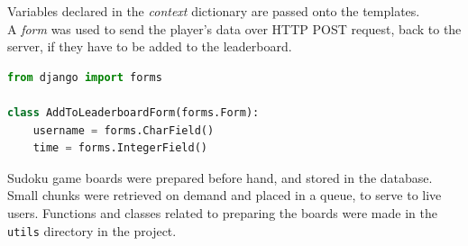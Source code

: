 \documentclass[12pt, a4paper]{report}
\begin{document}
    Variables declared in the \textit{context} dictionary are passed onto the templates.\\
    \newline
    A \emph{form} was used to send the player's data over HTTP POST request, back to the server, if they have to be added to the leaderboard.
    \begin{lstlisting}[language=Python, caption=mainapp/forms.py]
from django import forms

class AddToLeaderboardForm(forms.Form):
    username = forms.CharField()
    time = forms.IntegerField()
    \end{lstlisting}
    Sudoku game boards were prepared before hand, and stored in the database. Small chunks were retrieved on demand and placed in a queue, to serve to live users.
    Functions and classes related to preparing the boards were made in the \texttt{utils} directory in the project.\\
\end{document}
